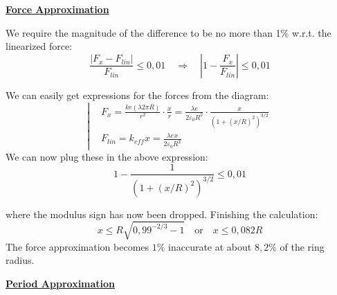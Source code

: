 \newpage
\begin{description}[leftmargin=!, labelwidth=\widthof{$\bullet$}]
	\item[$\bullet$] \textbf{\underline{Force Approximation}}
	
	We require the magnitude of the difference to be no more than 1\% w.r.t. the linearized force:
	\begin{equation*}
		\frac{|F_x - F_{lin}|}{F_{lin}} \leq 0{,}01
		\quad\Rightarrow\quad
		\left|
		1 - \frac{F_x}{F_{lin}}
		\right|
		\leq
		0{,}01
	\end{equation*}
	
	\begin{minipage}[t][117pt]{\textwidth}
		\vspace{0pt}
		
		\begin{minipage}[t][116pt]{0.64\textwidth}
			\vspace{0pt}
			We can easily get expressions for the forces from the diagram:
			\begin{equation*}
				\left|
				\begin{aligned}
					& F_x = \frac{ke (\lambda 2 \pi R)}{r^2} \cdot \frac{x}{r}
					=
					\frac{\lambda e}{2 \varepsilon_0 R^2}
					\cdot
					\frac{x}{(1 + (x/R)^2)^{3/2}}
					\\
					& F_{lin} = k_{eff} x = \frac{\lambda e x}{2\varepsilon_0 R^2}
				\end{aligned}
				\right.
			\end{equation*}
			We can now plug these in the above expression:
			\begin{equation*}
				1 - \frac{1}{(1 + (x/R)^2)^{3/2}} \leq 0{,}01
			\end{equation*}
		\end{minipage}
	\end{minipage}
	
	\vspace{1em}
	where the modulus sign has now been dropped. Finishing the calculation:
	\begin{equation*}
		\boxed{x \leq R \sqrt{0{,}99^{-2/3} - 1}}
		\quad\text{or}\quad
		\boxed{x \leq 0{,}082 R}
		\tag{$4$}
		\label{eq:j17_p5_4}
	\end{equation*}
	The force approximation becomes $1\%$ inaccurate at about $8{,}2\%$ of the ring radius.
	\item[$\bullet$] \textbf{\underline{Period Approximation}}
	

\end{description}
